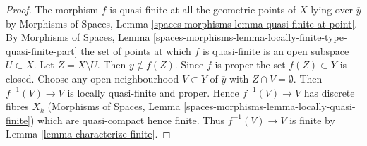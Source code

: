 \documentclass{stacks-project}
\theoremstyle{plain}
\theoremstyle{definition}
\theoremstyle{remark}
\numberwithin{equation}{subsection}
\begin{document}
\begin{proof}
The morphism $f$ is quasi-finite at all the geometric points of $X$
lying over $\overline{y}$ by
Morphisms of Spaces, Lemma \ref{spaces-morphisms-lemma-quasi-finite-at-point}.
By Morphisms of Spaces, Lemma
\ref{spaces-morphisms-lemma-locally-finite-type-quasi-finite-part} the
set of points at which $f$ is quasi-finite is an open subspace $U \subset X$.
Let $Z = X \setminus U$. Then $\overline{y} \not \in f(Z)$. Since $f$
is proper the set $f(Z) \subset Y$ is closed. Choose any open neighbourhood
$V \subset Y$ of $\overline{y}$ with $Z \cap V = \emptyset$. Then
$f^{-1}(V) \to V$ is locally quasi-finite and proper.
Hence $f^{-1}(V) \to V$ has discrete fibres $X_k$
(Morphisms of Spaces, Lemma
\ref{spaces-morphisms-lemma-locally-quasi-finite})
which are quasi-compact hence finite.
Thus $f^{-1}(V) \to V$
is finite by Lemma \ref{lemma-characterize-finite}.
\end{proof}








\end{document}
